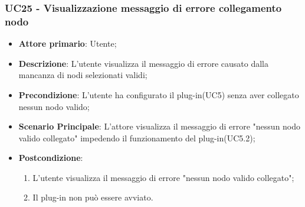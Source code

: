 \subsubsection{UC25 - Visualizzazione messaggio di errore collegamento nodo}
\label{sssec:uc25}
\begin{itemize}
  \item \textbf{Attore primario}: Utente;
  \item \textbf{Descrizione}: L'utente visualizza il messaggio di errore causato dalla mancanza di nodi selezionati validi;
  \item \textbf{Precondizione}: L'utente ha configurato il plug-in(UC5) senza aver collegato nessun nodo valido;
  \item \textbf{Scenario Principale}: L'attore visualizza il messaggio di errore "nessun nodo valido collegato" impedendo il funzionamento del plug-in(UC5.2);
  \item \textbf{Postcondizione}:
  \begin{enumerate}
		\item L'utente visualizza il messaggio di errore "nessun nodo valido collegato";
		\item Il plug-in non può essere avviato.
	\end{enumerate}
\end{itemize}

